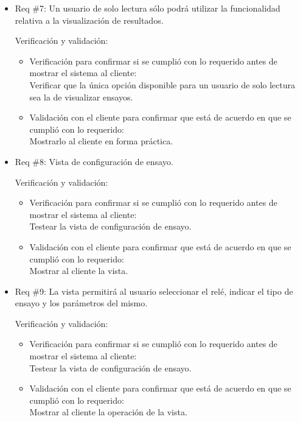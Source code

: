 \documentclass[11pt]{charter}
\begin{document}
\begin{itemize}
\item Req \#7: Un usuario de solo lectura sólo podrá utilizar la funcionalidad relativa a la visualización de resultados.

Verificación y validación:

\begin{itemize}
\item Verificación para confirmar si se cumplió con lo requerido antes de mostrar el sistema al cliente:\\
Verificar que la única opción disponible para un usuario de solo lectura sea la de visualizar ensayos.
\item Validación con el cliente para confirmar que está de acuerdo en que se cumplió con lo requerido:\\
Mostrarlo al cliente en forma práctica.
\end{itemize}

\item Req \#8: Vista de configuración de ensayo.

Verificación y validación:

\begin{itemize}
\item Verificación para confirmar si se cumplió con lo requerido antes de mostrar el sistema al cliente:\\
Testear la vista de configuración de ensayo.
\item Validación con el cliente para confirmar que está de acuerdo en que se cumplió con lo requerido:\\
Mostrar al cliente la vista.
\end{itemize}

\item Req \#9: La vista permitirá al usuario seleccionar el relé, indicar el tipo de ensayo y los parámetros del mismo.

Verificación y validación:

\begin{itemize}
\item Verificación para confirmar si se cumplió con lo requerido antes de mostrar el sistema al cliente:\\
Testear la vista de configuración de ensayo.
\item Validación con el cliente para confirmar que está de acuerdo en que se cumplió con lo requerido:\\
Mostrar al cliente la operación de la vista.
\end{itemize}


\end{itemize}
\end{document}
